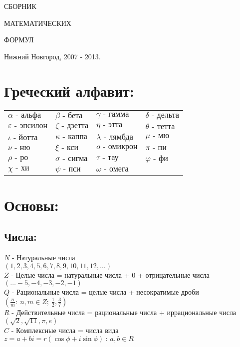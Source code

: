 \documentclass[12pt, a4paper]{article}
\begin{document}
\begin{titlepage}
\vspace*{5cm}
\begin{center}
{\Huge СБОРНИК}
\end{center}
\begin{center}
{\Huge МАТЕМАТИЧЕСКИХ}
\end{center}
\begin{center}
{\Huge ФОРМУЛ}
\end{center}
\vfill 
\begin{center} 
{\rm \large Нижний Новгород, 2007 - 2013.} 
\end {center} 
\end{titlepage} 
\tableofcontents
\newpage
\section{Греческий алфавит:}
\begin{tabular}{llll}
	$ \alpha    \text{ - альфа}$   & $ \beta  \text{ - бета}$    & $ \gamma    \text{ - гамма}$   & $ \delta \text{ - дельта}$  \\
  $ \varepsilon  \text{ - эпсилон}$ & $ \zeta  \text{ - дзетта}$  & $ \eta      \text{ - этта}$    & $ \theta \text{ - тетта}$  \\
  $ \iota     \text{ - йотта}$   & $ \kappa \text{ - каппа}$   & $ \lambda   \text{ - лямбда }$ & $ \mu    \text{ - мю}$     \\
	$ \nu       \text{ - ню}$      & $ \xi    \text{ - кси}$     & $ o         \text{ - омикрон}$ & $ \pi    \text{ - пи}$     \\
	$ \rho      \text{ - ро}$      & $ \sigma \text{ - сигма}$   & $ \tau      \text{ - тау}$     & $ \varphi   \text{ - фи}$     \\
	$ \chi      \text{ - хи}$      & $ \psi   \text{ - пси}$     & $ \omega \text{ - омега}$      & $ $ \\
	
\end{tabular}
\newpage
\section{Основы:}
\subsection{Числа:}
$N$ - Натуральные числа \\ $(1, 2, 3, 4, 5, 6, 7, 8, 9, 10, 11, 12, \ldots)$ \\
$Z$ - Целые числа = натуральные числа + $0$ + отрицательные числа \\ $(\ldots -5, -4, -3, -2, -1)$ \\
$Q$ - Рациональные числа = целые числа + несократимые дроби \\ $ \displaystyle \left(\frac{n}{m}:\ n,m \in Z; \ \frac{1}{2},\frac{3}{7}\right)$ \\
$R$ - Действительные числа = рациональные числа + иррациональные числа \\  $\displaystyle \left(\sqrt{2},\sqrt{11}, \pi, e\right)$ \\
$C$ - Комплексные числа = числа вида \\ $z = a + bi = r(\cos \phi + i \sin \phi) \ : \ a,b \in R$
\end{document}
